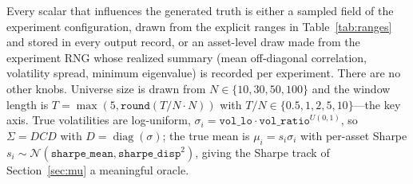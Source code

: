 \documentclass[11pt]{article}
\newcommand{\Sig}{\Sigma}
\newcommand{\TN}{T/N}
\begin{document}
Every scalar that influences the generated truth is either a sampled field of
the experiment configuration, drawn from the explicit ranges in
Table~\ref{tab:ranges} and stored in every output record, or an asset-level
draw made from the experiment RNG whose realized summary (mean off-diagonal
correlation, volatility spread, minimum eigenvalue) is recorded per
experiment. There are no other knobs. Universe size is drawn from
$N\in\{10,30,50,100\}$ and the window length is $T=\max(5,
\texttt{round}(\TN\cdot N))$ with
$\TN\in\{0.5,1,2,5,10\}$---the key axis. True volatilities are log-uniform,
$\sigma_i=\texttt{vol\_lo}\cdot\texttt{vol\_ratio}^{U(0,1)}$, so
$\Sig=DCD$ with $D=\operatorname{diag}(\sigma)$; the true mean is
$\mu_i=s_i\sigma_i$ with per-asset Sharpe
$s_i\sim\mathcal{N}(\texttt{sharpe\_mean},\texttt{sharpe\_disp}^2)$, giving
the Sharpe track of Section~\ref{sec:mu} a meaningful oracle.
\end{document}
